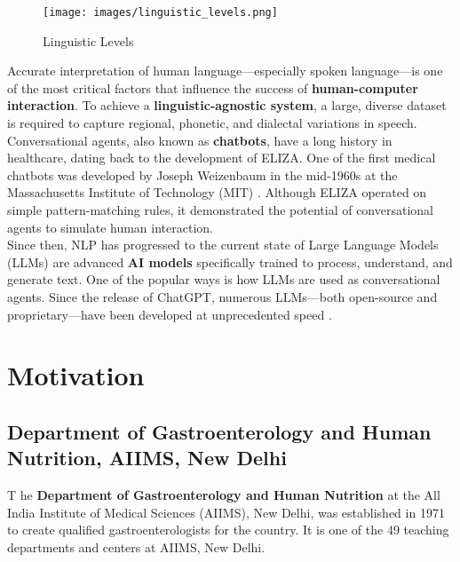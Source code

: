 \begin{figure}[h]
    \centering
    \texttt{[image: images/linguistic\_levels.png]}
    \caption{Linguistic Levels}
    \label{fig:linguistic_levels}
\end{figure}

\noindent Accurate interpretation of human language---especially spoken language---is one of the most critical factors that influence the success of \textcolor{TUMRed}{\textbf{human-computer interaction}}. To achieve a \textcolor{TUMRed}{\textbf{linguistic-agnostic system}}, a large, diverse dataset is required to capture regional, phonetic, and dialectal variations in speech.\\[\baselineskip]

\noindent Conversational agents, also known as \textcolor{TUMRed}{\textbf{chatbots}}, have a long history in healthcare, dating back to the development of ELIZA. One of the first medical chatbots was developed by Joseph Weizenbaum in the mid-1960s at the Massachusetts Institute of Technology (MIT) \cite{haug2023artificial, weizenbaum1966eliza}. Although ELIZA operated on simple pattern-matching rules, it demonstrated the potential of conversational agents to simulate human interaction.\\[\baselineskip]

\noindent Since then, NLP has progressed to the current state of Large Language Models (LLMs) are advanced \textcolor{TUMRed}{\textbf{AI models}} specifically trained to process, understand, and generate text. One of the popular ways is how LLMs are used as conversational agents. Since the release of ChatGPT, numerous LLMs---both open-source and proprietary---have been developed at unprecedented speed \cite{clusmann2023future}. 


\section{Motivation}
\subsection{Department of Gastroenterology and Human Nutrition, AIIMS, New Delhi}
\lettrine{T}{ }he \textcolor{TUMRed}{\textbf{Department of Gastroenterology and Human Nutrition}} at the All India Institute of Medical Sciences (AIIMS), New Delhi, was established in 1971 to create qualified gastroenterologists for the country. It is one of the 49 teaching departments and centers at AIIMS, New Delhi.\\[\baselineskip]


